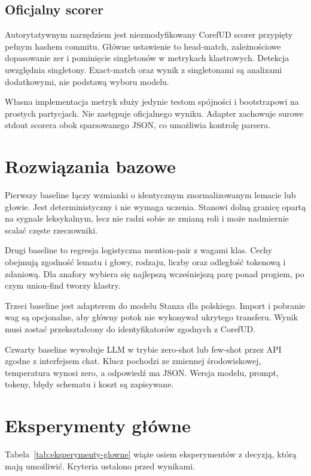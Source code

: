 \subsection{Oficjalny scorer}

Autorytatywnym narzędziem jest niezmodyfikowany CorefUD scorer przypięty pełnym hashem commitu. Główne ustawienie to head-match, zależnościowe dopasowanie zer i pominięcie singletonów w metrykach klastrowych. Detekcja uwzględnia singletony. Exact-match oraz wynik z singletonami są analizami dodatkowymi, nie podstawą wyboru modelu.

Własna implementacja metryk służy jedynie testom spójności i bootstrapowi na prostych partycjach. Nie zastępuje oficjalnego wyniku. Adapter zachowuje surowe stdout scorera obok sparsowanego JSON, co umożliwia kontrolę parsera.

\section{Rozwiązania bazowe}
\label{sec:baseline-eksperymentalne}

Pierwszy baseline łączy wzmianki o identycznym znormalizowanym lemacie lub głowie. Jest deterministyczny i nie wymaga uczenia. Stanowi dolną granicę opartą na sygnale leksykalnym, lecz nie radzi sobie ze zmianą roli i może nadmiernie scalać częste rzeczowniki.

Drugi baseline to regresja logistyczna mention-pair z wagami klas. Cechy obejmują zgodność lematu i głowy, rodzaju, liczby oraz odległość tokenową i zdaniową. Dla anafory wybiera się najlepszą wcześniejszą parę ponad progiem, po czym union-find tworzy klastry.

Trzeci baseline jest adapterem do modelu Stanza dla polskiego. Import i pobranie wag są opcjonalne, aby główny potok nie wykonywał ukrytego transferu. Wynik musi zostać przekształcony do identyfikatorów zgodnych z CorefUD.

Czwarty baseline wywołuje LLM w trybie zero-shot lub few-shot przez API zgodne z interfejsem chat. Klucz pochodzi ze zmiennej środowiskowej, temperatura wynosi zero, a odpowiedź ma JSON. Wersja modelu, prompt, tokeny, błędy schematu i koszt są zapisywane.

\section{Eksperymenty główne}
\label{sec:eksperymenty-glowne}

Tabela~\ref{tab:eksperymenty-glowne} wiąże osiem eksperymentów z decyzją, którą mają umożliwić. Kryteria ustalono przed wynikami.

